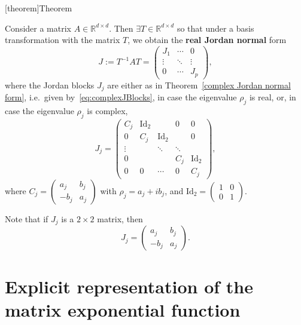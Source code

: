 \documentclass[12pt]{report}
\theoremstyle{definition}
\begin{document}
[theorem]{Theorem}
\begin{real jordan normal form}
    Consider a matrix $A\in\mathbb{R}^{d\times d}$.
    Then $\exists T\in\mathbb{R}^{d\times d}$ so that under a basis
    transformation with the matrix $T$, we obtain the 
    \textbf{real Jordan normal} form
    \[
        J:=T^{-1}AT=
        \begin{pmatrix}
            J_1 & \cdots & 0 \\
            \vdots & \ddots & \vdots \\
            0 & \cdots & J_p
        \end{pmatrix},
    \]
    where the Jordan blocks $J_j$ are either as in 
    Theorem~\ref{complex Jordan normal form}, i.e.\ given
    by~\eqref{eq:complexJBlocks}, in case the eigenvalue $\rho_j$ is real,
    or, in case the eigenvalue $\rho_j$ is complex,
    \begin{equation}\label{eq:realJBlocks}
        J_j=\begin{pmatrix}
            C_j & \text{Id}_2 &   & 0 & 0 \\
            0 & C_j & \text{Id}_2 &   & 0 \\
            \vdots &   & \ddots & \ddots &  \\
            0 &   &   & C_j & \text{Id}_2 \\
            0 & 0 & \cdots & 0 & C_j
        \end{pmatrix},
    \end{equation} 
    where $C_j = \begin{pmatrix}
        a_j & b_j \\
        -b_j & a_j
    \end{pmatrix} $ with $\rho_j=a_j+ib_j$, and
    $\text{Id}_2=\begin{pmatrix}
        1 & 0 \\
        0 & 1
    \end{pmatrix} $.
\end{real jordan normal form}
Note that if $J_j$ is a $2\times 2$ matrix, then
\[
    J_j = \begin{pmatrix}
        a_j & b_j \\
        -b_j & a_j
    \end{pmatrix}.
\]

\section{Explicit representation of the matrix exponential function}
\end{document}
